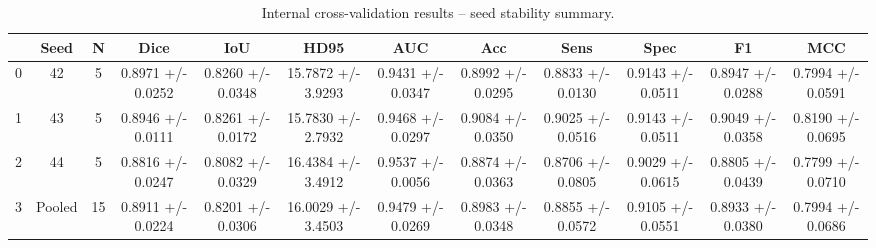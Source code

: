 \begin{table}[htbp]
  \centering
  \caption{Internal cross-validation results -- seed stability summary.}
  \label{tab:internal_cv_compact}
  \begin{tabular}{lccccccccccc}
    \toprule
     & Seed & N & Dice & IoU & HD95 & AUC & Acc & Sens & Spec & F1 & MCC \\
    \midrule
    0 & 42 & 5 & 0.8971 +/- 0.0252 & 0.8260 +/- 0.0348 & 15.7872 +/- 3.9293 & 0.9431 +/- 0.0347 & 0.8992 +/- 0.0295 & 0.8833 +/- 0.0130 & 0.9143 +/- 0.0511 & 0.8947 +/- 0.0288 & 0.7994 +/- 0.0591 \\
    1 & 43 & 5 & 0.8946 +/- 0.0111 & 0.8261 +/- 0.0172 & 15.7830 +/- 2.7932 & 0.9468 +/- 0.0297 & 0.9084 +/- 0.0350 & 0.9025 +/- 0.0516 & 0.9143 +/- 0.0511 & 0.9049 +/- 0.0358 & 0.8190 +/- 0.0695 \\
    2 & 44 & 5 & 0.8816 +/- 0.0247 & 0.8082 +/- 0.0329 & 16.4384 +/- 3.4912 & 0.9537 +/- 0.0056 & 0.8874 +/- 0.0363 & 0.8706 +/- 0.0805 & 0.9029 +/- 0.0615 & 0.8805 +/- 0.0439 & 0.7799 +/- 0.0710 \\
    \cmidrule(lr){1-12}
    3 & Pooled & 15 & 0.8911 +/- 0.0224 & 0.8201 +/- 0.0306 & 16.0029 +/- 3.4503 & 0.9479 +/- 0.0269 & 0.8983 +/- 0.0348 & 0.8855 +/- 0.0572 & 0.9105 +/- 0.0551 & 0.8933 +/- 0.0380 & 0.7994 +/- 0.0686 \\
    \bottomrule
  \end{tabular}
\end{table}